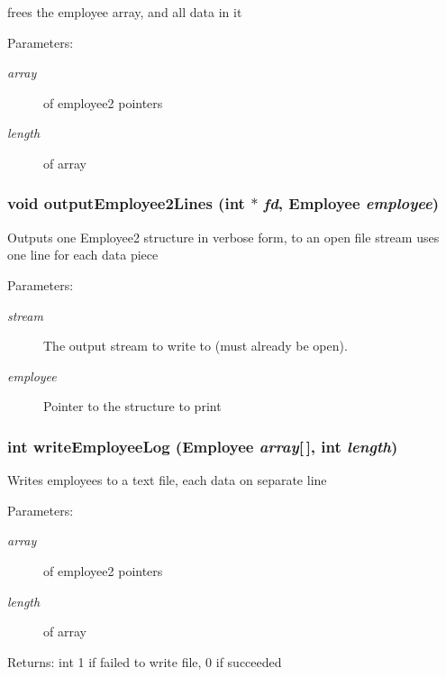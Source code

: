 frees the employee array, and all data in it \begin{Desc}
\item[Parameters:]
\begin{description}
\item[{\em array}]of employee2 pointers \item[{\em length}]of array \end{description}
\end{Desc}
\subsubsection{\setlength{\rightskip}{0pt plus 5cm}void output\-Employee2Lines (int $\ast$ {\em fd}, \bf{Employee} {\em employee})}\label{part6_8h_249e312ace90679ac0bf7d2a32bb9069}


Outputs one Employee2 structure in verbose form, to an open file stream uses one line for each data piece \begin{Desc}
\item[Parameters:]
\begin{description}
\item[{\em stream}]The output stream to write to (must already be open). \item[{\em employee}]Pointer to the structure to print \end{description}
\end{Desc}
\subsubsection{\setlength{\rightskip}{0pt plus 5cm}int write\-Employee\-Log (\bf{Employee} {\em array}[$\,$], int {\em length})}\label{part6_8h_85c8a4fb48576504799ee5dd64a18d30}


Writes employees to a text file, each data on separate line \begin{Desc}
\item[Parameters:]
\begin{description}
\item[{\em array}]of employee2 pointers \item[{\em length}]of array \end{description}
\end{Desc}
\begin{Desc}
\item[Returns:]int 1 if failed to write file, 0 if succeeded \end{Desc}
